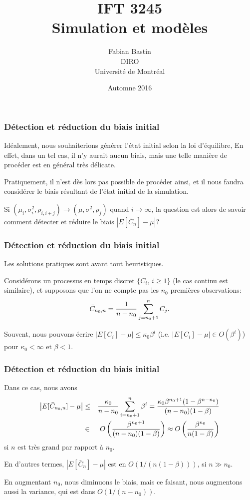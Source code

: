\documentclass[t,usepdftitle=false]{beamer}
\title[IFT3245]{IFT 3245\\Simulation et modèles}
\author[Fabian Bastin]{Fabian Bastin\\DIRO\\Université de Montréal}
\date{Automne 2016}
\begin{document}
\frame{\titlepage}

\begin{frame}
\frametitle{Détection et réduction du biais initial}

Idéalement, nous souhaiterions générer l'état initial selon la loi
d'équilibre,
En effet, dans un tel cas, il n'y aurait aucun biais, mais une telle
manière de procéder est en général très délicate.

\mbox{}

Pratiquement, il n'est dès lors pas possible de procéder ainsi, et il
nous faudra considérer le biais résultant de l'état initial de la
simulation.

\mbox{}

Si $(\mu_i, \sigma_i^2, \rho_{i,i+j}) \to (\mu, \sigma^2, \rho_j)$
quand $i\to\infty$, la question est alors de savoir comment détecter et
réduire le biais $|E[\bar C_n] - \mu|$? 

\end{frame}

\begin{frame}
\frametitle{Détection et réduction du biais initial}

Les solutions pratiques sont avant tout heuristiques.

\mbox{}

Considérons un processus en temps discret $\{{C_i},\, i\ge 1\}$ (le
cas continu est similaire), et supposons que l'on ne compte pas les
${n_0}$ premières observations:
\[
 \bar C_{n_0,n} = {1\over n-n_0} \sum_{j=n_0+1}^n C_j.
\]

\mbox{}

Souvent, nous pouvons écrire $|E[C_i]-\mu| \le \kappa_0 \beta^i$
(i.e. $|E[C_i] - \mu| \in O(\beta^i)$) pour $\kappa_0 < \infty$ et
${\beta} < 1$.

\end{frame}

\begin{frame}
\frametitle{Détection et réduction du biais initial}

Dans ce cas, nous avons
\begin{eqnarray*}
 \left| E[\bar C_{n_0,n}]-\mu \right|
 &\le& {\kappa_0\over n-n_0} \sum_{i=n_0+1}^n \beta^i
  = {\kappa_0\beta^{n_0+1}(1-\beta^{n-n_0}) \over (n-n_0)(1-\beta)} \\
 &\in& O\left(\frac{\beta^{n_0+1}}{(n-n_0)(1-\beta)}\right) 
  \approx O\left(\frac{\beta^{n_0}}{n(1-\beta)}\right)
\end{eqnarray*}
si $n$ est très grand par rapport à $n_0$.

\mbox{}

En d'autres termes, $|E[\bar C_n] - \mu|$ est en $O(1/(n(1-\beta)))$,
si $n \gg n_0$.

\mbox{}

En augmentant $n_0$, nous diminuons le biais, mais ce faisant, nous
augmentons aussi la variance, qui est dans $O(1/(n-n_0))$.

\end{frame}
\end{document}
